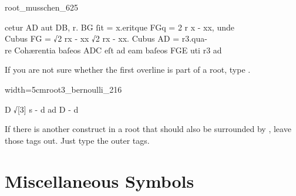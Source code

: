 \vspace{3mm}
\begin{sampleImage}{root_musschen_625}
\begin{typeLatin}
 \someText
{}cetur AD aut DB, r. BG ſit = x.\lwr eritque FGq = 2 r x - x\lwr x, unde  \\
Cubus FG = √\bold{\{}2 rx - xx\lwr{}  √\bold{\{}2 rx - \lwr xx.\bold{\}}  Cubus AD = r3.\lwr qua- \\
re Cohærentia baſeos ADC eſt ad eam baſeos FGE uti r\lwr{}3 ad \\
\someText {}
\end{typeLatin}
\end{sampleImage}

\begin{note}
If you are not sure whether the first overline is part of a root, type .
\end{note}

\vspace{3mm}
\begin{sampleImageSmall}{width=5cm}{root3_bernoulli_216}
\begin{typeLatin}
D √[3] s - d ad D - \lwr{}d
\end{typeLatin}
\end{sampleImageSmall}

\begin{note}
If there is another construct in a root that should also be surrounded by , leave those tags out. Just type the outer  tags.
\end{note}



\section{Miscellaneous Symbols}


